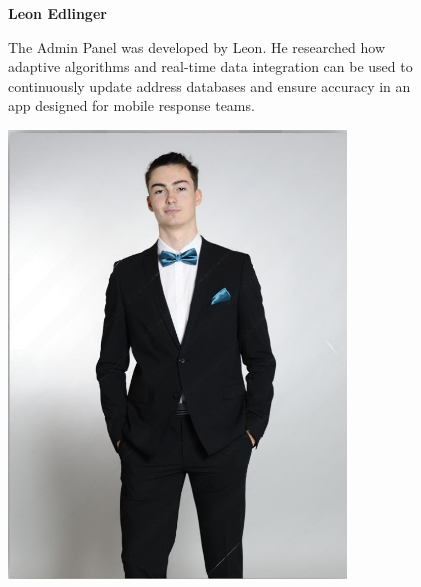 \begin{figure}[H]
        \centering
        \begin{minipage}{0.6\textwidth}
          \setlength{\baselineskip}{1.5em}
          \vspace{-1em}
          \textbf{Leon Edlinger}

          The Admin Panel was developed by Leon. He researched how adaptive algorithms and real-time data integration can be used to continuously update address databases and ensure accuracy in an app designed for mobile response teams. 
        \end{minipage}
        \hfill
        \begin{minipage}{0.35\textwidth}
            \center
            \includegraphics[width=0.8\textwidth]{images/people/leonEdlinger.jpeg} 
    \end{minipage}
    \end{figure}

